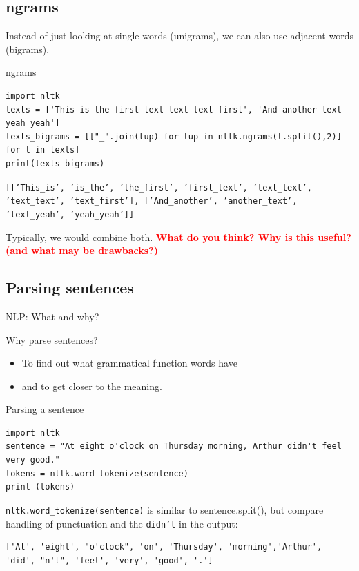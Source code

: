 \documentclass{beamer}
\begin{document}
\subsection{ngrams}
Instead of just looking at single words (unigrams), we can also use adjacent words (bigrams).
\begin{frame}[fragile]{ngrams}
\begin{lstlisting}
import nltk
texts = ['This is the first text text text first', 'And another text yeah yeah']
texts_bigrams = [["_".join(tup) for tup in nltk.ngrams(t.split(),2)] for t in texts]
print(texts_bigrams)
\end{lstlisting}
\texttt{[['This\_is',
	'is\_the',
	'the\_first',
	'first\_text',
	'text\_text',
	'text\_text',
	'text\_first'],
	['And\_another', 'another\_text', 'text\_yeah', 'yeah\_yeah']]
}

Typically, we would combine both.
\pause
\textbf{\textcolor{red}{What do you think? Why is this useful? (and what may be drawbacks?)}}
\end{frame}


\subsection{Parsing sentences}
\begin{frame}{NLP: What and why?}
\begin{block}{Why parse sentences?}
\begin{itemize}
\item To find out what grammatical function words have
\item and to get closer to the meaning.
\end{itemize}
\end{block}
\end{frame}

\begin{frame}[fragile]{Parsing a sentence}
\begin{lstlisting}
import nltk
sentence = "At eight o'clock on Thursday morning, Arthur didn't feel very good."
tokens = nltk.word_tokenize(sentence)
print (tokens)
\end{lstlisting}

\texttt{nltk.word\_tokenize(sentence)} is similar to sentence.split(), but compare handling of punctuation and the \texttt{didn't} in the output:
\begin{lstlisting}
['At', 'eight', "o'clock", 'on', 'Thursday', 'morning','Arthur', 'did', "n't", 'feel', 'very', 'good', '.']
\end{lstlisting}
\end{frame}
\end{document}

